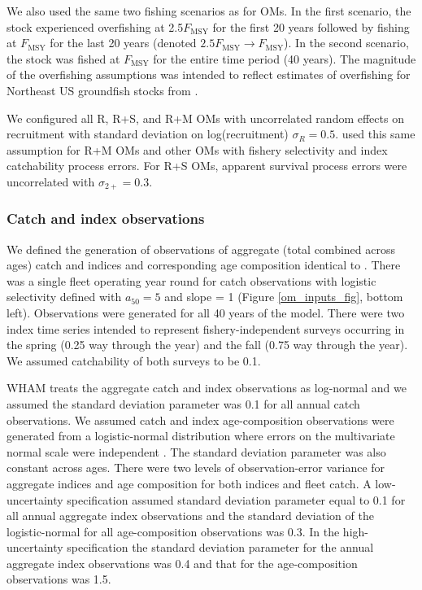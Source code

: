 \documentclass[
  12pt,
]{article}
\newcommand{\Fmsy}{\ensuremath{F_{\text{MSY}}}\xspace}
\begin{document}
We also used the same two fishing scenarios as \citet{milleretal_inreview1} for OMs. In the first scenario, the stock experienced overfishing at 2.5\Fmsy for the first 20 years followed by fishing at \Fmsy for the last 20 years (denoted \(2.5\Fmsy \rightarrow \Fmsy\)). In the second scenario, the stock was fished at \Fmsy for the entire time period (40 years). The magnitude of the overfishing assumptions was intended to reflect estimates of overfishing for Northeast US groundfish stocks from \citet{wiedenmannetal19}.

We configured all R, R+S, and R+M OMs with uncorrelated random effects on recruitment with standard deviation on log(recruitment) \(\sigma_R = 0.5\). \citet{milleretal_inreview1} used this same assumption for R+M OMs and other OMs with fishery selectivity and index catchability process errors. For R+S OMs, apparent survival process errors were uncorrelated with \(\sigma_{2+} = 0.3\).

\subsubsection*{Catch and index observations}\label{catch-and-index-observations}

We defined the generation of observations of aggregate (total combined across ages) catch and indices and corresponding age composition identical to \citet{milleretal_inreview1}. There was a single fleet operating year round for catch observations with logistic selectivity defined with \(a_{50} = 5\) and slope = 1 (Figure \ref{om_inputs_fig}, bottom left). Observations were generated for all 40 years of the model. There were two index time series intended to represent fishery-independent surveys occurring in the spring (0.25 way through the year) and the fall (0.75 way through the year). We assumed catchability of both surveys to be 0.1.

WHAM treats the aggregate catch and index observations as log-normal and we assumed the standard deviation parameter was 0.1 for all annual catch observations. We assumed catch and index age-composition observations were generated from a logistic-normal distribution where errors on the multivariate normal scale were independent \citep{aitchisonshen80, stockmiller21, trijouletetal23}. The standard deviation parameter was also constant across ages. There were two levels of observation-error variance for aggregate indices and age composition for both indices and fleet catch. A low-uncertainty specification assumed standard deviation parameter equal to 0.1 for all annual aggregate index observations and the standard deviation of the logistic-normal for all age-composition observations was 0.3. In the high-uncertainty specification the standard deviation parameter for the annual aggregate index observations was 0.4 and that for the age-composition observations was 1.5.
\end{document}
